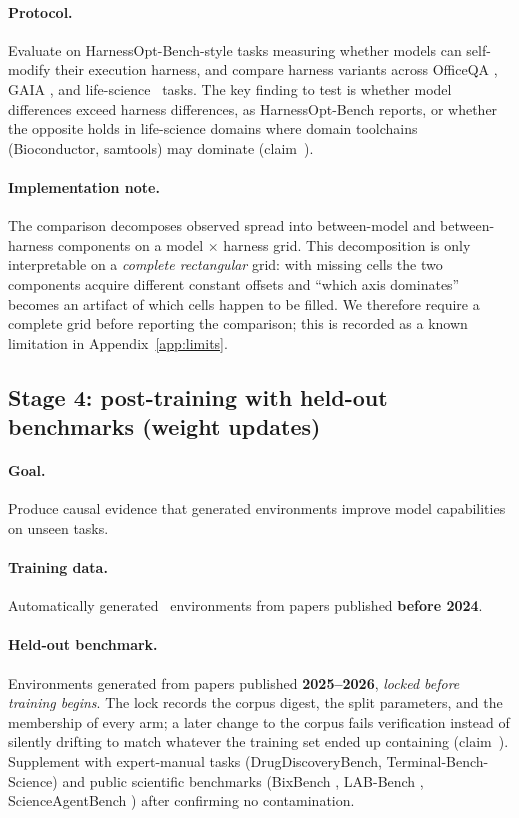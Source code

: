 \paragraph{Protocol.} Evaluate on HarnessOpt-Bench-style tasks
\cite{harnessoptbench} measuring whether models can self-modify their execution
harness, and compare harness variants across OfficeQA \cite{officeqa}, GAIA
\cite{gaia}, and life-science \harbor\ tasks. The key finding to test is whether
model differences exceed harness differences, as HarnessOpt-Bench reports, or
whether the opposite holds in life-science domains where domain toolchains
(Bioconductor, samtools) may dominate (claim~).

\paragraph{Implementation note.} The comparison decomposes observed spread into
between-model and between-harness components on a model $\times$ harness grid.
This decomposition is only interpretable on a \emph{complete rectangular} grid:
with missing cells the two components acquire different constant offsets and
``which axis dominates'' becomes an artifact of which cells happen to be filled.
We therefore require a complete grid before reporting the comparison; this is
recorded as a known limitation in Appendix~\ref{app:limits}.

\subsection{Stage 4: post-training with held-out benchmarks (weight updates)}
\label{sec:stage4}

\paragraph{Goal.} Produce causal evidence that generated environments improve
model capabilities on unseen tasks.

\paragraph{Training data.} Automatically generated \harbor\ environments from
papers published \textbf{before 2024}.

\paragraph{Held-out benchmark.} Environments generated from papers published
\textbf{2025--2026}, \emph{locked before training begins}. The lock records the
corpus digest, the split parameters, and the membership of every arm; a later
change to the corpus fails verification instead of silently drifting to match
whatever the training set ended up containing (claim~). Supplement with
expert-manual tasks (DrugDiscoveryBench, Terminal-Bench-Science) and public
scientific benchmarks (BixBench \cite{bixbench}, LAB-Bench \cite{labbench},
ScienceAgentBench \cite{scienceagentbench}) after confirming no contamination.

